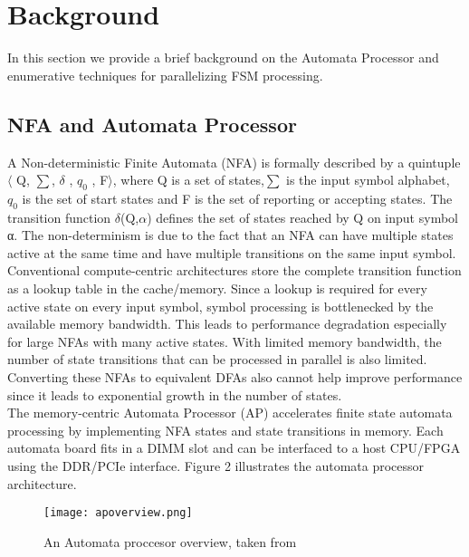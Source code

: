 \section{\textbf{Background}}
In this section we provide a brief background on the Automata Processor and enumerative techniques for parallelizing FSM processing.
\subsection{NFA and Automata Processor}
A Non-deterministic Finite Automata (NFA) is formally described
by a quintuple $\langle$ Q, $\sum$, $\delta$ , $q_0$ , F$\rangle$, where Q is a set of states,$\sum$  is the
input symbol alphabet, $q_0$ is the set of start states and F is the set 
of reporting or accepting states. The transition function $\delta$(Q,$\alpha$)
defines the set of states reached by Q on input symbol α. The non-determinism is due to the fact that an NFA can have multiple states
active at the same time and have multiple transitions on the same
input symbol.\\
Conventional compute-centric architectures store the complete transition function as a lookup table in the cache/memory. Since a lookup
is required for every active state on every input symbol, symbol processing is bottlenecked by the available memory bandwidth. This
leads to performance degradation especially for large NFAs with
many active states. With limited memory bandwidth, the number
of state transitions that can be processed in parallel is also limited.
Converting these NFAs to equivalent DFAs also cannot help improve
performance since it leads to exponential growth in the number of
states.\\
The memory-centric Automata Processor (AP) accelerates finite
state automata processing by implementing NFA states and state
transitions in memory. Each automata board fits in a DIMM slot
and can be interfaced to a host CPU/FPGA using the DDR/PCIe
interface. Figure 2 illustrates the automata processor architecture.
\begin{figure}[!h]
\texttt{[image: apoverview.png]}
\centering
\caption{An Automata proccesor overview, taken from \cite{1}}
\end{figure}

